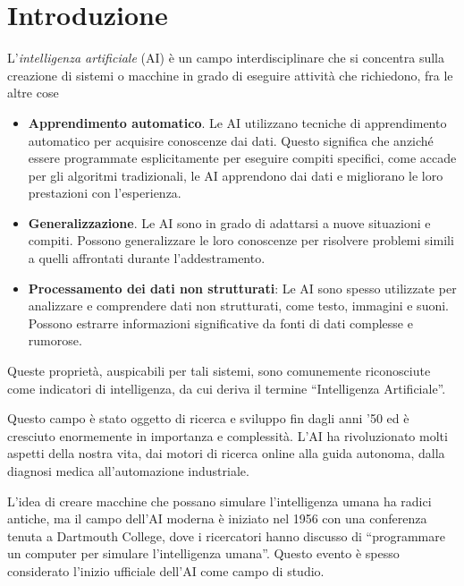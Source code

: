 \documentclass[12pt,a4paper,twoside,openright]{book}
\begin{document}
\frontmatter 

\maketitle

\chapter*{Introduzione}


L'\emph{intelligenza artificiale} (AI) è un campo interdisciplinare che si concentra sulla creazione di sistemi o macchine in grado di eseguire attività che richiedono, fra le altre cose

\begin{itemize}
    \item \textbf{Apprendimento automatico}. Le AI utilizzano tecniche di apprendimento automatico per acquisire conoscenze dai dati. Questo significa che anziché essere programmate esplicitamente per eseguire compiti specifici, come accade per gli algoritmi tradizionali, le AI apprendono dai dati e migliorano le loro prestazioni con l'esperienza. 
    \item \textbf{Generalizzazione}. Le AI sono in grado di adattarsi a nuove situazioni e compiti. Possono generalizzare le loro conoscenze per risolvere problemi simili a quelli affrontati durante l'addestramento. 
    \item \textbf{Processamento dei dati non strutturati}: Le AI sono spesso utilizzate per analizzare e comprendere dati non strutturati, come testo, immagini e suoni. Possono estrarre informazioni significative da fonti di dati complesse e rumorose.
\end{itemize}

Queste proprietà, auspicabili per tali sistemi, sono comunemente riconosciute come indicatori di intelligenza, da cui deriva il termine ``Intelligenza Artificiale''.

Questo campo è stato oggetto di ricerca e sviluppo fin dagli anni '50 ed è cresciuto enormemente in importanza e complessità. L'AI ha rivoluzionato molti aspetti della nostra vita, dai motori di ricerca online alla guida autonoma, dalla diagnosi medica all'automazione industriale. 


L'idea di creare macchine che possano simulare l'intelligenza umana ha radici antiche, ma il campo dell'AI moderna è iniziato nel 1956 con una conferenza tenuta a Dartmouth College, dove i ricercatori hanno discusso di ``programmare un computer per simulare l'intelligenza umana''. Questo evento è spesso considerato l'inizio ufficiale dell'AI come campo di studio.
\end{document}
